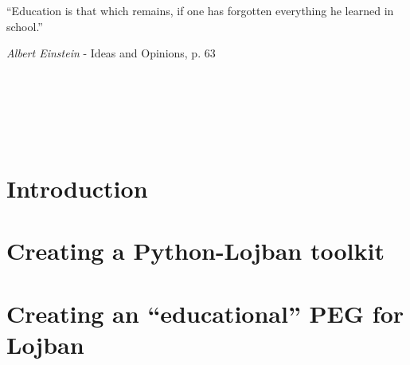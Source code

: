 

\usepackage[
    backend=bibtex, style=verbose, defernumbers=true, backref=true, block=none, hyperref=true
]{biblatex}

\setlength{}




\pagestyle{empty}
\newpage \ \newpage


\newpage \ \newpage

\renewcommand{\epigraphsize}{\large}
\renewcommand{\epigraphwidth}{10cm}
\vspace{3cm}
\epigraph{``Education is that which remains, if one has forgotten everything he learned in school.''}{\textit{Albert Einstein} - Ideas and Opinions, p. 63}
\newpage \ \newpage

%

\vspace{-1cm}
\setcounter{tocdepth}{3}
\tableofcontents
\newpage \ \newpage
\listoffigures
\newpage \ \newpage %

\makeatletter
\@openrightfalse
\makeatother
\pagestyle{fancy}
\part{Introduction}



\part{Creating a Python-Lojban toolkit}



\part{Creating an ``educational'' PEG for Lojban}


